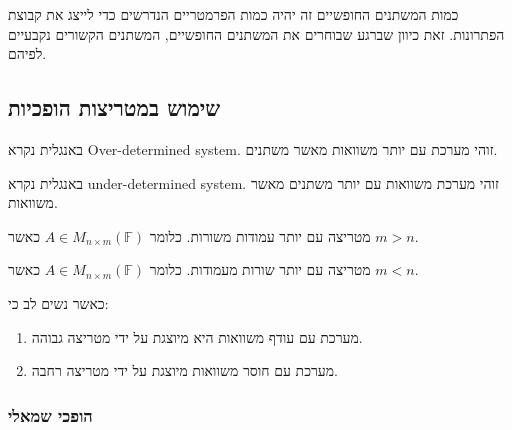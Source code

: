 \documentclass{tstextbook}
\begin{document}
\begin{proposition}
כמות המשתנים החופשיים זה יהיה כמות הפרמטריים הנדרשים כדי לייצג את קבוצת הפתרונות. זאת כיוון שברגע שבוחרים את המשתנים החופשיים, המשתנים הקשורים נקבעיים לפיהם.

\end{proposition}
\subsection{שימוש במטריצות הופכיות}

\begin{definition}
באנגלית נקרא Over-determined system. זוהי מערכת עם יותר משוואות מאשר משתנים.

\end{definition}
\begin{definition}
באנגלית נקרא under-determined system. זוהי מערכת משוואות עם יותר משתנים מאשר משוואות.

\end{definition}
\begin{definition}
מטריצה עם יותר עמודות משורות. כלומר \(A \in M_{n \times m}\left( \mathbb{F}  \right)\) כאשר \(m>n\).

\end{definition}
\begin{definition}
מטריצה עם יותר שורות מעמודות. כלומר \(A \in M_{n \times m}\left( \mathbb{F}  \right)\) כאשר \(m<n\).

\end{definition}
כאשר נשים לב כי:

\begin{enumerate}
  \item מערכת עם עודף משוואות היא מיוצגת על ידי מטריצה גבוהה. 


  \item מערכת עם חוסר משוואות מיוצגת על ידי מטריצה רחבה. 


\end{enumerate}
\subsubsection{הופכי שמאלי}
\end{document}
